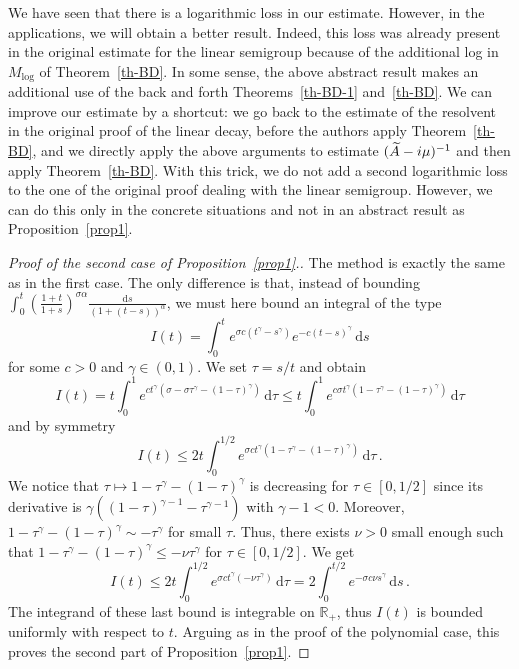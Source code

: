 \documentclass[AHL,Unicode,longabstracts]{cedram}
\newcommand{\RR}{\mathbb{R}}
\newcommand{\drm}{\mathrm{d}}
\let\oldtilde\tilde
\renewcommand*{\tilde}[1]{\mathchoice{\widetilde{#1}}{\widetilde{#1}}{\oldtilde{#1}}{\oldtilde{#1}}}\let\oldexists\exists
\renewcommand*{\exists}{\mathrel{\oldexists}}
\begin{document}
\begin{rema}\label{remark-log}
We have seen that there is a logarithmic loss in our estimate. However, in the applications, we will obtain a better result. Indeed, this loss was already present in the original estimate for the linear semigroup because of the additional log in $M_{\text{log}}$ of Theorem~\ref{th-BD}. In some sense, the above abstract result makes an additional use of the back and forth Theorems~\ref{th-BD-1} and~\ref{th-BD}. We can improve our estimate by a shortcut: we go back to the estimate of the resolvent in the original proof of the linear decay, before the authors apply Theorem~\ref{th-BD}, and we directly apply the above arguments to estimate $(\tilde A-i\mu)^{-1}$ and then apply Theorem~\ref{th-BD}. With this trick, we do not add a second logarithmic loss to the one of the original proof dealing with the linear semigroup. However, we can do this only in the concrete situations and not in an abstract result as Proposition~\ref{prop1}.
\end{rema}

\begin{proof}[{Proof of the second case of Proposition~\ref{prop1}.}]
The method is exactly the same as in the first case. The only difference is that, instead of bounding $\int_0^t
\left(\frac{1+t}{1+s}\right)^{\sigma\alpha}
\frac{\drm s}{(1+(t-s))^\alpha}$, we must here bound an integral of the type
\[
I(t)=\int_0^t e^{\sigma c(t^\gamma-s^\gamma)}
e^{-c (t-s)^\gamma}\,\drm s
\]
for some $c>0$ and $\gamma \in(0,1)$. We set $\tau=s/t$ and obtain
\[
I(t)=t\int_0^1
e^{c{t^\gamma}(\sigma-\sigma \tau^\gamma-(1-\tau)^\gamma)}\,\drm\tau \leq t\int_0^1 e^{c \sigma t^\gamma(1-\tau^\gamma-(1-\tau)^\gamma)}\,\drm\tau
\]
and by symmetry
\[
I(t)\leq 2t\int_0^{1/2}
e^{ \sigma c t^\gamma(1-{\tau}^\gamma-(1-\tau)^\gamma)}\,\drm\tau\,.
\]
We notice that $\tau\mapsto 1-\tau^\gamma-(1-\tau)^\gamma$ is decreasing for $\tau\in [0,1/2]$ since its derivative is $\gamma((1-\tau)^{\gamma-1}-\tau^{\gamma-1})$ with $\gamma-1 < 0$. Moreover, $1-\tau^\gamma-(1-\tau)^\gamma \sim -\tau^\gamma$ for small $\tau$. Thus, there exists $\nu>0$ small enough such that $1-\tau^\gamma-(1-\tau)^\gamma \leq -\nu \tau^\gamma$ for $\tau\in[0,1/2]$. We get
\[
I(t)\leq 2t\int_0^{1/2} e^{\sigma c t^\gamma (-\nu
\tau^\gamma)}\,\drm\tau= 2\int_0^{t/2} e^{-\sigma c \nu s^\gamma}\,\drm s\,.
\]
The integrand of these last bound is integrable on $\RR_+$, thus $I(t)$ is bounded uniformly with respect to $t$. Arguing as in the proof of the polynomial case, this proves the second part of Proposition~\ref{prop1}. 
\end{proof}
\end{document}
